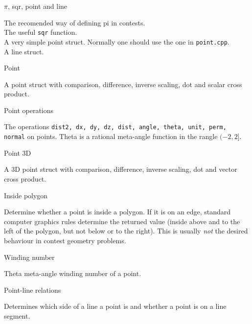 \begin{algorithm}{$\pi$, sqr, point and line}

The recomended way of defining pi in contests. \\
The useful {\tt sqr} function. \\
A very simple point struct.
Normally one should use the one in {\tt point.cpp}. \\
A line struct.
\end{algorithm}

\begin{algorithm}{Point}

A point struct with comparison, difference, inverse scaling, dot and
scalar cross product.
\end{algorithm}

\begin{algorithm}{Point operations}

The operations {\tt dist2, dx, dy, dz, dist, angle, theta, unit, perm, normal}
on points. Theta is a rational meta-angle function in the rangle $(-2,2]$.
\end{algorithm}

\begin{algorithm}{Point 3D}

A 3D point struct with comparison, difference, inverse scaling, dot and
vector cross product.
\end{algorithm}

\begin{algorithm}{Inside polygon}

Determine whether a point is inside a polygon. If it is on an edge,
standard computer graphics rules determine the returned value (inside above
and to the left of the polygon, but not below or to the right).
This is usually \emph{not} the desired behaviour in contest geometry problems.
\end{algorithm}

\begin{algorithm}{Winding number}

Theta meta-angle winding number of a point.
\end{algorithm}

\begin{algorithm}{Point-line relations}

Determines which side of a line a point is and whether a point is on a line
segment.
\end{algorithm}

